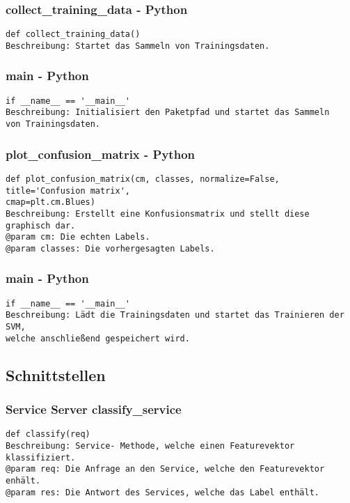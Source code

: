 \documentclass{suturo}
\begin{document}
\subsubsection{collect\_training\_data - Python}
\begin{verbatim}
def collect_training_data()
Beschreibung: Startet das Sammeln von Trainingsdaten.
\end{verbatim}

\subsubsection{main - Python}
\begin{verbatim}
if __name__ == '__main__'
Beschreibung: Initialisiert den Paketpfad und startet das Sammeln 
von Trainingsdaten.
\end{verbatim}

\subsubsection{plot\_confusion\_matrix - Python}
\begin{verbatim}
def plot_confusion_matrix(cm, classes, normalize=False, title='Confusion matrix',
cmap=plt.cm.Blues)
Beschreibung: Erstellt eine Konfusionsmatrix und stellt diese graphisch dar. 
@param cm: Die echten Labels.
@param classes: Die vorhergesagten Labels.
\end{verbatim}

\subsubsection{main - Python}
\begin{verbatim}
if __name__ == '__main__'
Beschreibung: Lädt die Trainingsdaten und startet das Trainieren der SVM, 
welche anschließend gespeichert wird.
\end{verbatim}

\subsection{Schnittstellen}

\subsubsection{Service Server classify\_service}
\begin{verbatim}
def classify(req)
Beschreibung: Service- Methode, welche einen Featurevektor klassifiziert.
@param req: Die Anfrage an den Service, welche den Featurevektor enhält.  
@param res: Die Antwort des Services, welche das Label enthält.
\end{verbatim}
\end{document}
